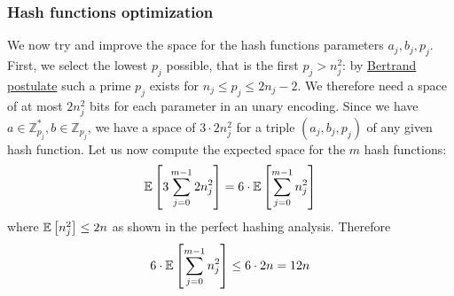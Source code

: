 \subsubsection{Hash functions optimization}
We now try and improve the space for the hash functions parameters $a_j, b_j, p_j$.
First, we select the lowest $p_j$ possible, that is the first $p_j > n_j^2$: by \href{https://en.wikipedia.org/wiki/Bertrand\%27s_postulate}{Bertrand postulate} such a prime $p_j$ exists for $n_j \leq p_j \leq 2n_j - 2$.
We therefore need a space of at most $2n_j^2$ bits for each parameter in an unary encoding.
Since we have $a \in \mathbb{Z}_{p_j}^*, b \in \mathbb{Z}_{p_j}$, we have a space of $3 \cdot 2n_j^2$ for a triple $(a_j, b_j, p_j)$ of any given hash function.
Let us now compute the expected space for the $m$ hash functions:
\begin{equation*}
\mathbb{E}\left[{3 \sum_{j=0}^{m-1}2n_j^2}\right] =
6 \cdot \mathbb{E}\left[{\sum_{j=0}^{m-1}n_j^2}\right]
\end{equation*}
where $\mathbb{E}\left[{n_j^2}\right] \leq 2n$ as shown in the perfect hashing analysis.
Therefore
\begin{equation*}
6 \cdot \mathbb{E}\left[{\sum_{j=0}^{m-1} n_j^2}\right] \leq 6 \cdot 2n = 12n
\end{equation*}